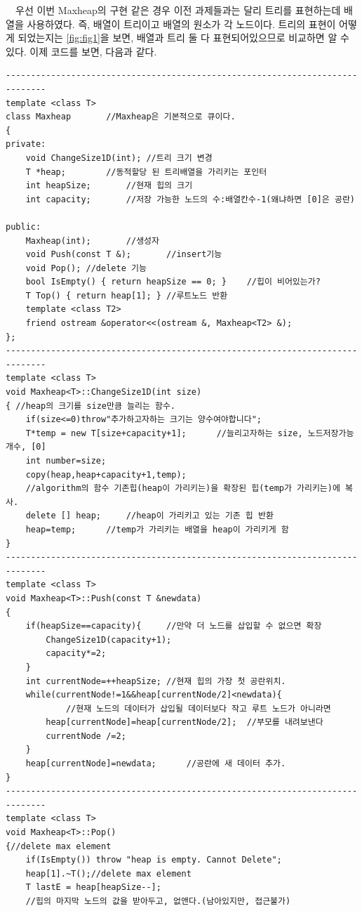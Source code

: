 \documentclass[a4paper,11pt]{article}
\begin{document}
\ \ 우선 이번 Maxheap의 구현 같은 경우 이전 과제들과는 달리 트리를 표현하는데 배열을 사용하였다. 즉, 배열이 트리이고 배열의 원소가 각 노드이다. 트리의 표현이 어떻게 되었는지는 \ref{fig:fig1}을 보면, 배열과 트리 둘 다 표현되어있으므로 비교하면 알 수 있다. 이제 코드를 보면, 다음과 같다.
\begin{Verbatim}
------------------------------------------------------------------------------
template <class T>
class Maxheap		//Maxheap은 기본적으로 큐이다.
{
private:
    void ChangeSize1D(int);	//트리 크기 변경
    T *heap;		//동적할당 된 트리배열을 가리키는 포인터
    int heapSize;		//현재 힙의 크기
    int capacity;		//저장 가능한 노드의 수:배열칸수-1(왜냐하면 [0]은 공란)

public:
    Maxheap(int);		//생성자
    void Push(const T &);		//insert기능
    void Pop();	//delete 기능
    bool IsEmpty() { return heapSize == 0; }	//힙이 비어있는가?
    T Top() { return heap[1]; }	//루트노드 반환
    template <class T2>
    friend ostream &operator<<(ostream &, Maxheap<T2> &);
};
------------------------------------------------------------------------------
template <class T>
void Maxheap<T>::ChangeSize1D(int size)
{ //heap의 크기를 size만큼 늘리는 함수.
    if(size<=0)throw"추가하고자하는 크기는 양수여야합니다";
    T*temp = new T[size+capacity+1];      //늘리고자하는 size, 노드저장가능개수, [0]
    int number=size;
    copy(heap,heap+capacity+1,temp);		
    //algorithm의 함수 기존힙(heap이 가리키는)을 확장된 힙(temp가 가리키는)에 복사.
    delete [] heap;		//heap이 가리키고 있는 기존 힙 반환
    heap=temp;		//temp가 가리키는 배열을 heap이 가리키게 함
}
------------------------------------------------------------------------------
template <class T>
void Maxheap<T>::Push(const T &newdata)
{
    if(heapSize==capacity){ 	//만약 더 노드를 삽입할 수 없으면 확장
        ChangeSize1D(capacity+1);
        capacity*=2;
    }
    int currentNode=++heapSize; //현재 힙의 가장 첫 공란위치.
    while(currentNode!=1&&heap[currentNode/2]<newdata){ 
    		//현재 노드의 데이터가 삽입될 데이터보다 작고 루트 노드가 아니라면 
        heap[currentNode]=heap[currentNode/2];  //부모를 내려보낸다
        currentNode /=2;
    }
    heap[currentNode]=newdata;		//공란에 새 데이터 추가.
}
------------------------------------------------------------------------------
template <class T>
void Maxheap<T>::Pop()
{//delete max element
    if(IsEmpty()) throw "heap is empty. Cannot Delete";
    heap[1].~T();//delete max element
    T lastE = heap[heapSize--]; 
    //힙의 마지막 노드의 값을 받아두고, 없앤다.(남아있지만, 접근불가)


\end{Verbatim}
\end{document}
